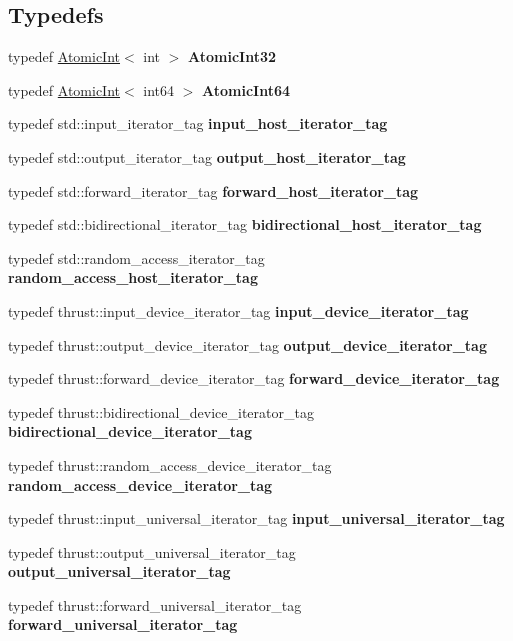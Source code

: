 \subsection*{Typedefs}
\begin{DoxyCompactItemize}
\item 
typedef \hyperlink{structcugar_1_1_atomic_int}{Atomic\+Int}$<$ int $>$ {\bfseries Atomic\+Int32}
\item 
typedef \hyperlink{structcugar_1_1_atomic_int}{Atomic\+Int}$<$ int64 $>$ {\bfseries Atomic\+Int64}
\item 
typedef std\+::input\+\_\+iterator\+\_\+tag {\bfseries input\+\_\+host\+\_\+iterator\+\_\+tag}
\item 
typedef std\+::output\+\_\+iterator\+\_\+tag {\bfseries output\+\_\+host\+\_\+iterator\+\_\+tag}
\item 
typedef std\+::forward\+\_\+iterator\+\_\+tag {\bfseries forward\+\_\+host\+\_\+iterator\+\_\+tag}
\item 
typedef std\+::bidirectional\+\_\+iterator\+\_\+tag {\bfseries bidirectional\+\_\+host\+\_\+iterator\+\_\+tag}
\item 
typedef std\+::random\+\_\+access\+\_\+iterator\+\_\+tag {\bfseries random\+\_\+access\+\_\+host\+\_\+iterator\+\_\+tag}
\item 
typedef thrust\+::input\+\_\+device\+\_\+iterator\+\_\+tag {\bfseries input\+\_\+device\+\_\+iterator\+\_\+tag}
\item 
typedef thrust\+::output\+\_\+device\+\_\+iterator\+\_\+tag {\bfseries output\+\_\+device\+\_\+iterator\+\_\+tag}
\item 
typedef thrust\+::forward\+\_\+device\+\_\+iterator\+\_\+tag {\bfseries forward\+\_\+device\+\_\+iterator\+\_\+tag}
\item 
typedef thrust\+::bidirectional\+\_\+device\+\_\+iterator\+\_\+tag {\bfseries bidirectional\+\_\+device\+\_\+iterator\+\_\+tag}
\item 
typedef thrust\+::random\+\_\+access\+\_\+device\+\_\+iterator\+\_\+tag {\bfseries random\+\_\+access\+\_\+device\+\_\+iterator\+\_\+tag}
\item 
typedef thrust\+::input\+\_\+universal\+\_\+iterator\+\_\+tag {\bfseries input\+\_\+universal\+\_\+iterator\+\_\+tag}
\item 
typedef thrust\+::output\+\_\+universal\+\_\+iterator\+\_\+tag {\bfseries output\+\_\+universal\+\_\+iterator\+\_\+tag}
\item 
typedef thrust\+::forward\+\_\+universal\+\_\+iterator\+\_\+tag {\bfseries forward\+\_\+universal\+\_\+iterator\+\_\+tag}

\end{DoxyCompactItemize}
